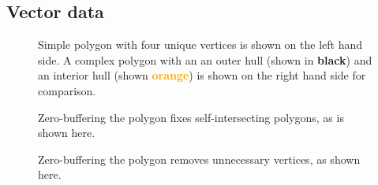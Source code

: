 \subsection{Vector data}

\begin{figure}[htb]
  \centering
  
  \textcolor{gray}{\vrule}
  \hspace{0.01\linewidth}
  
  \caption{
    Simple polygon with four unique vertices is shown on the left hand side.
    A complex polygon with an an outer hull (shown in \textbf{black})
    and an interior hull (shown \textcolor{orange}{\textbf{orange}}) is shown on the right hand side for comparison.
  }
\end{figure}

\begin{figure}[H]
  \centering
  
  \caption{Zero-buffering the polygon fixes self-intersecting polygons, as is shown here.}
\end{figure}

\begin{figure}[H]
  \centering
  
  \caption{Zero-buffering the polygon removes unnecessary vertices, as shown here.}
\end{figure}
